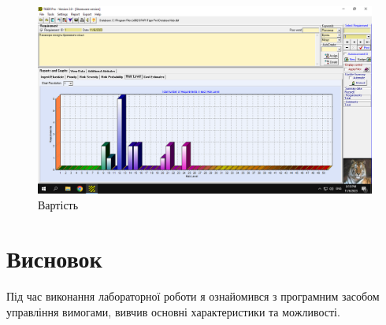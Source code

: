 \documentclass[14pt]{extreport}
\begin{document}
\begin{normalsize}
	\begin{figure}[H]
		\centering
		\includegraphics[scale=0.5]{8}
		\caption{Вартість}
	\end{figure}
	\section*{Висновок}
	Під час виконання лабораторної роботи я ознайомився з програмним засобом управління вимогами, вивчив основні характеристики та можливості.
	
\end{normalsize}
\end{document}

